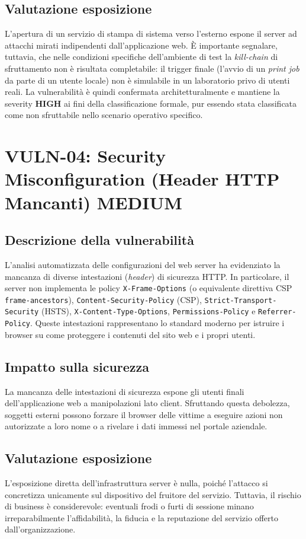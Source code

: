 \documentclass[11pt]{report}
\newcommand{\sevMED}{\textcolor{sevMedio}{\textbf{MEDIUM}}}
\begin{document}
	\subsection{Valutazione esposizione}
	L'apertura di un servizio di stampa di sistema verso l'esterno espone il server ad attacchi mirati indipendenti dall'applicazione web. È importante segnalare, tuttavia, che nelle condizioni specifiche dell'ambiente di test la \textit{kill-chain} di sfruttamento non è risultata completabile: il trigger finale (l'avvio di un \textit{print job} da parte di un utente locale) non è simulabile in un laboratorio privo di utenti reali. La vulnerabilità è quindi confermata architetturalmente e mantiene la severity \textbf{HIGH} ai fini della classificazione formale, pur essendo stata classificata come non sfruttabile nello scenario operativo specifico.
	
	\section[Security Misconfiguration]{VULN-04: Security Misconfiguration (Header HTTP Mancanti) \hfill \sevMED}
	\subsection{Descrizione della vulnerabilità}
	L'analisi automatizzata delle configurazioni del web server ha evidenziato la mancanza di diverse intestazioni (\textit{header}) di sicurezza HTTP. In particolare, il server non implementa le policy \texttt{X-Frame-Options} (o equivalente direttiva CSP \texttt{frame-ancestors}), \texttt{Content-Security-Policy} (CSP), \texttt{Strict-Transport-Security} (HSTS), \texttt{X-Content-Type-Options}, \texttt{Permissions-Policy} e \texttt{Referrer-Policy}. Queste intestazioni rappresentano lo standard moderno per istruire i browser su come proteggere i contenuti del sito web e i propri utenti.
	
	\subsection{Impatto sulla sicurezza}
	La mancanza delle intestazioni di sicurezza espone gli utenti finali dell'applicazione web a manipolazioni lato client. Sfruttando questa debolezza, soggetti esterni possono forzare il browser delle vittime a eseguire azioni non autorizzate a loro nome o a rivelare i dati immessi nel portale aziendale.
	
	\subsection{Valutazione esposizione}
	L'esposizione diretta dell'infrastruttura server è nulla, poiché l'attacco si concretizza unicamente sul dispositivo del fruitore del servizio. Tuttavia, il rischio di business è considerevole: eventuali frodi o furti di sessione minano irreparabilmente l'affidabilità, la fiducia e la reputazione del servizio offerto dall'organizzazione.
	
\end{document}
